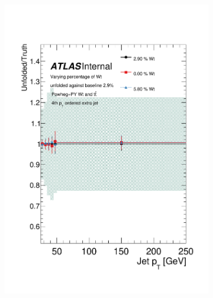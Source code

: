 \begin{figure}
\begin{subfigure}[]{0.3\textwidth}
\includegraphics[width=\textwidth]{fig/Wt/TruthRatioJet3.pdf}
\end{subfigure}
~
\begin{subfigure}[]{0.3\textwidth}

\end{subfigure}
\end{figure}
